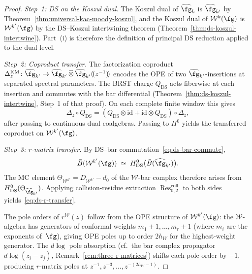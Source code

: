 \begin{proof}
\emph{Step~1: DS on the Koszul dual.}
The Koszul dual of $\widehat{\fg}_k$ is $\widehat{\fg}_{k'}$
by Theorem~\ref{thm:universal-kac-moody-koszul}, and the
Koszul dual of $\mathcal{W}^k(\fg)$ is
$\mathcal{W}^{k'}(\fg)$ by the DS--Koszul intertwining
theorem (Theorem~\ref{thm:ds-koszul-intertwine}). Part~(i)
is therefore the definition of principal DS reduction applied
to the dual level.

\emph{Step~2: Coproduct transfer.}
The factorization coproduct
$\Delta_z^{\mathrm{KM}} \colon
\widehat{\fg}_{k'} \to
\widehat{\fg}_{k'} \,\widehat{\otimes}\,
\widehat{\fg}_{k'}(\!(z^{-1})\!)$
encodes the OPE of two $\widehat{\fg}_{k'}$-insertions at
separated spectral parameters. The BRST charge
$Q_{\mathrm{DS}}$ acts fiberwise at each insertion and
commutes with the bar differential
(Theorem~\ref{thm:ds-koszul-intertwine}, Step~1 of that proof).
On each complete finite window this gives
\[
\Delta_z \circ Q_{\mathrm{DS}}
= (Q_{\mathrm{DS}} \otimes \mathrm{id}
+ \mathrm{id} \otimes Q_{\mathrm{DS}}) \circ \Delta_z,
\]
after passing to continuous dual coalgebras. Passing to $H^0$
yields the transferred coproduct on $\mathcal{W}^{k'}(\fg)$.

\emph{Step~3: $r$-matrix transfer.}
By DS--bar commutation~\eqref{eq:ds-bar-commute},
\[
 \bar{B}(\mathcal{W}^{k'}(\fg))
 \;\simeq\;
 H^0_{\mathrm{DS}}\bigl(\bar{B}(\widehat{\fg}_{k'})\bigr).
\]
The MC element $\Theta_{\mathcal{W}^{k'}}
= D_{\mathcal{W}^{k'}} - d_0$ of the $\mathcal{W}$-bar complex
therefore arises from
$H^0_{\mathrm{DS}}(\Theta_{\widehat{\fg}_{k'}})$.
Applying collision-residue extraction
$\operatorname{Res}^{\mathrm{coll}}_{0,2}$ to both sides
yields~\eqref{eq:ds-r-transfer}.

The pole orders of $r^{\mathcal{W}}(z)$ follow from
the OPE structure of $\mathcal{W}^{k'}(\fg)$: the
$\mathcal{W}$-algebra has generators of conformal weights
$m_1 + 1, \ldots, m_r + 1$ (where $m_i$ are the exponents
of~$\fg$), giving OPE poles up to order $2h_W$ for the
highest-weight generator. The $d\log$ pole absorption
(cf.\ the bar complex propagator $d\log(z_i - z_j)$,
Remark~\ref{rem:three-r-matrices}) shifts each pole
order by $-1$, producing $r$-matrix poles at
$z^{-1}, z^{-3}, \ldots, z^{-(2h_W - 1)}$.
\end{proof}

